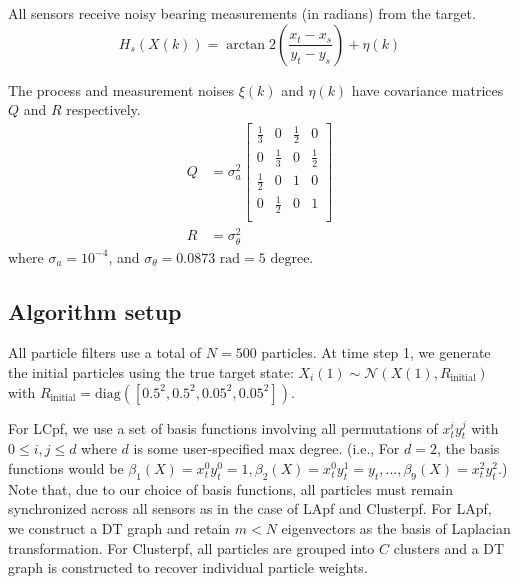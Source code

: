 \documentclass[10pt,letterpaper,final]{article}
\begin{document}
All sensors receive noisy bearing measurements (in radians) from the target.
\begin{equation}
H_s(X(k))= \arctan2 \left( \frac{x_t-x_s}{y_t-y_s} \right) + \eta(k)
\end{equation}

The process and measurement noises $\xi(k)$ and $\eta(k)$ have covariance matrices $Q$ and $R$ respectively.
\begin{align}
Q &= \sigma_a^2
\left[
\begin{array}{cccc}
\frac{1}{3} & 0 & \frac{1}{2} & 0 \\
0 & \frac{1}{3} & 0 & \frac{1}{2} \\
\frac{1}{2} & 0 & 1 & 0 \\
0 & \frac{1}{2} & 0 & 1 \\
\end{array}
\right]\\
R &= \sigma_{\theta}^2
\end{align}
where $\sigma_a=10^{-4}$, and $\sigma_{\theta}=0.0873\text{ rad} = 5 \text{ degree}$.


\subsection{Algorithm setup}
All particle filters use a total of $N=500$ particles. At time step 1, we generate the initial particles using the true target state: $X_i(1) \sim \mathcal{N}(X(1), R_{\text{initial}})$ with $R_{\text{initial}}=\text{diag}([0.5^2,0.5^2,0.05^2,0.05^2])$. 

For LCpf, we use a set of basis functions involving all permutations of $x_t^iy_t^j$ with $0\leq i, j \leq d$ where $d$ is some user-specified max degree. (i.e., For $d=2$, the basis functions would be $\beta_1(X) = x_t^0 y_t^0 = 1, \beta_2(X) = x_t^0 y_t^1 = y_t, ..., \beta_9(X) = x_t^2 y_t^2 $.) Note that, due to our choice of basis functions, all particles must remain synchronized across all sensors as in the case of LApf and Clusterpf. For LApf, we construct a DT graph and retain $m< N$ eigenvectors as the basis of Laplacian transformation. For Clusterpf, all particles are grouped into $C$ clusters and a DT graph is constructed to recover individual particle weights. 
\end{document}
